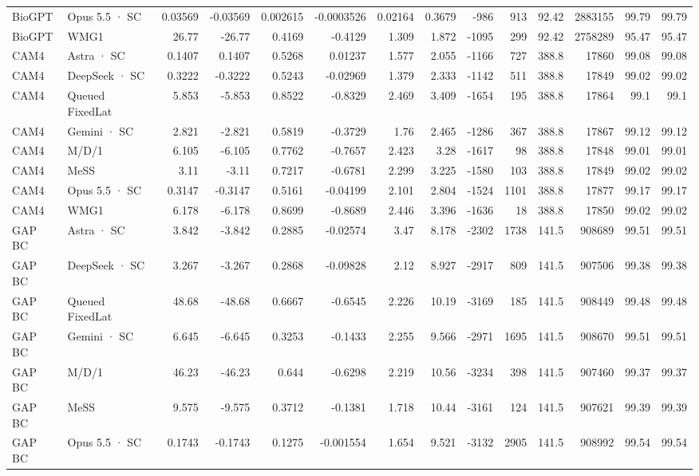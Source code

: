 \begin{tabular}{llrrrrrrrrrrrr}
BioGPT & Opus 5.5 · SC & 0.03569 & -0.03569 & 0.002615 & -0.0003526 & 0.02164 & 0.3679 & -986 & 913 & 92.42 & 2883155 & 99.79 & 99.79 \\
BioGPT & WMG1 & 26.77 & -26.77 & 0.4169 & -0.4129 & 1.309 & 1.872 & -1095 & 299 & 92.42 & 2758289 & 95.47 & 95.47 \\
CAM4 & Astra · SC & 0.1407 & 0.1407 & 0.5268 & 0.01237 & 1.577 & 2.055 & -1166 & 727 & 388.8 & 17860 & 99.08 & 99.08 \\
CAM4 & DeepSeek · SC & 0.3222 & -0.3222 & 0.5243 & -0.02969 & 1.379 & 2.333 & -1142 & 511 & 388.8 & 17849 & 99.02 & 99.02 \\
CAM4 & Queued FixedLat & 5.853 & -5.853 & 0.8522 & -0.8329 & 2.469 & 3.409 & -1654 & 195 & 388.8 & 17864 & 99.1 & 99.1 \\
CAM4 & Gemini · SC & 2.821 & -2.821 & 0.5819 & -0.3729 & 1.76 & 2.465 & -1286 & 367 & 388.8 & 17867 & 99.12 & 99.12 \\
CAM4 & M/D/1 & 6.105 & -6.105 & 0.7762 & -0.7657 & 2.423 & 3.28 & -1617 & 98 & 388.8 & 17848 & 99.01 & 99.01 \\
CAM4 & MeSS & 3.11 & -3.11 & 0.7217 & -0.6781 & 2.299 & 3.225 & -1580 & 103 & 388.8 & 17849 & 99.02 & 99.02 \\
CAM4 & Opus 5.5 · SC & 0.3147 & -0.3147 & 0.5161 & -0.04199 & 2.101 & 2.804 & -1524 & 1101 & 388.8 & 17877 & 99.17 & 99.17 \\
CAM4 & WMG1 & 6.178 & -6.178 & 0.8699 & -0.8689 & 2.446 & 3.396 & -1636 & 18 & 388.8 & 17850 & 99.02 & 99.02 \\
GAP BC & Astra · SC & 3.842 & -3.842 & 0.2885 & -0.02574 & 3.47 & 8.178 & -2302 & 1738 & 141.5 & 908689 & 99.51 & 99.51 \\
GAP BC & DeepSeek · SC & 3.267 & -3.267 & 0.2868 & -0.09828 & 2.12 & 8.927 & -2917 & 809 & 141.5 & 907506 & 99.38 & 99.38 \\
GAP BC & Queued FixedLat & 48.68 & -48.68 & 0.6667 & -0.6545 & 2.226 & 10.19 & -3169 & 185 & 141.5 & 908449 & 99.48 & 99.48 \\
GAP BC & Gemini · SC & 6.645 & -6.645 & 0.3253 & -0.1433 & 2.255 & 9.566 & -2971 & 1695 & 141.5 & 908670 & 99.51 & 99.51 \\
GAP BC & M/D/1 & 46.23 & -46.23 & 0.644 & -0.6298 & 2.219 & 10.56 & -3234 & 398 & 141.5 & 907460 & 99.37 & 99.37 \\
GAP BC & MeSS & 9.575 & -9.575 & 0.3712 & -0.1381 & 1.718 & 10.44 & -3161 & 124 & 141.5 & 907621 & 99.39 & 99.39 \\
GAP BC & Opus 5.5 · SC & 0.1743 & -0.1743 & 0.1275 & -0.001554 & 1.654 & 9.521 & -3132 & 2905 & 141.5 & 908992 & 99.54 & 99.54 \\

\end{tabular}
